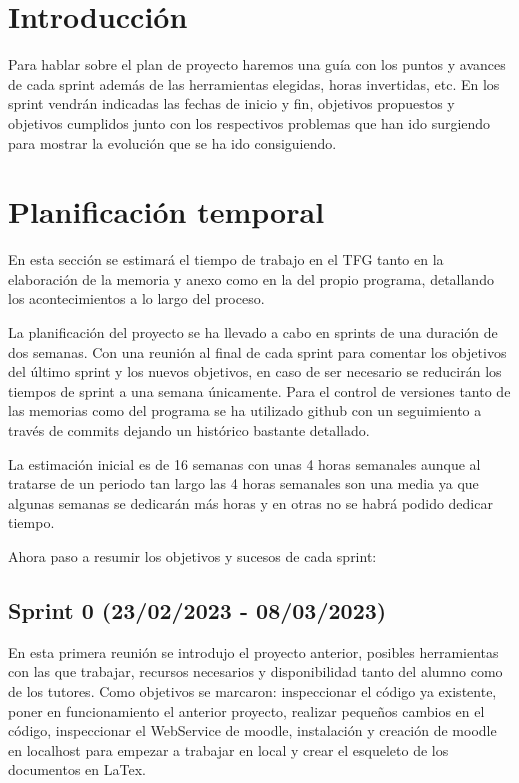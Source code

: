 
\section{Introducción}
Para hablar sobre el plan de proyecto haremos una guía con los puntos y avances de cada sprint además de las herramientas elegidas, horas invertidas, etc. En los sprint vendrán indicadas las fechas de inicio y fin, objetivos propuestos y objetivos cumplidos junto con los respectivos problemas que han ido surgiendo para mostrar la evolución que se ha ido consiguiendo.
\section{Planificación temporal}
En esta sección se estimará el tiempo de trabajo en el TFG tanto en la elaboración de la memoria y anexo como en la del propio programa, detallando los acontecimientos a lo largo del proceso.

La planificación del proyecto se ha llevado a cabo en sprints de una duración de dos semanas. Con una reunión al final de cada sprint para comentar los objetivos del último sprint y los nuevos objetivos, en caso de ser necesario se reducirán los tiempos de sprint a una semana únicamente. Para el control de versiones tanto de las memorias como del programa se ha utilizado github con un seguimiento a través de commits dejando un histórico bastante detallado.

La estimación inicial es de 16 semanas con unas 4 horas semanales aunque al tratarse de un periodo tan largo las 4 horas semanales son una media ya que algunas semanas se dedicarán más horas y en otras no se habrá podido dedicar tiempo.

Ahora paso a resumir los objetivos y sucesos de cada sprint:

\subsection{Sprint 0 (23/02/2023 - 08/03/2023)}
	En esta primera reunión se introdujo el proyecto anterior, posibles herramientas con las que trabajar, recursos necesarios y disponibilidad tanto del alumno como de los tutores. Como objetivos se marcaron: inspeccionar el código ya existente, poner en funcionamiento el anterior proyecto, realizar pequeños cambios en el código, inspeccionar el WebService de moodle, instalación y creación de moodle en localhost para empezar a trabajar en local y crear el esqueleto de los documentos en LaTex.
